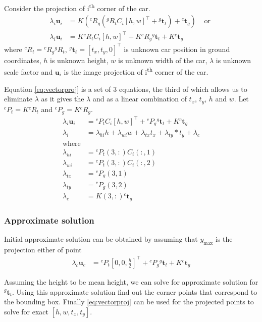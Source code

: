 \documentclass[10pt,twocolumn,letterpaper]{article}
\newcommand{\xymax}[1]{#1_{\text{max}}}
\newcommand{\ymax}{\xymax{y}}
\newcommand{\Tr}[3]{{}^{#1}{#2}_{#3}}
\begin{document}
\newcommand{\ttg}{\Tr{g}{\mathbf{t}}{t}}
\newcommand{\tgc}{\Tr{c}{\mathbf{t}}{g}}
\newcommand{\Rgc}{\Tr{c}{R}{g}}
\newcommand{\Rtg}{\Tr{g}{R}{t}}
\newcommand{\Rtc}{\Tr{c}{R}{t}}
\newcommand{\Pgc}{\Tr{c}{P}{g}}
\newcommand{\Ptc}{\Tr{c}{P}{t}}

Consider the projection of i\textsuperscript{th} corner of the car.
\begin{align}
  \lambda_i \mathbf{u}_i &= K(\Rgc(\Rtg C_i[h, w]^\top + \ttg) + \tgc) & \text{ or }\\
  \lambda_i \mathbf{u}_i &= K\Rtc C_i [h, w]^\top + K\Rgc \ttg + K \tgc
  \label{eq:vectorproj}
\end{align}
where $\Rtc = \Rgc\Rtg$, $\ttg = [t_x, t_y, 0]^\top$ is unknown car position in
ground coordinates, $h$ is unknown height, $w$ is unknown width of the car,
$\lambda$ is unknown scale factor and $\mathbf{u}_i$ is the image projection of
i\textsuperscript{th} corner of the car.

Equation \eqref{eq:vectorproj} is a set of 3 equations, the third of which allows us to eliminate $\lambda$ as it gives the $\lambda$ and as a linear combination of $t_x$, $t_y$, $h$ and $w$. Let $\Ptc = K\Rtc$ and $\Pgc = K\Rgc$.
\begin{align}
  \lambda_i \mathbf{u}_i &=  \Ptc C_i [h, w]^\top + \Pgc \ttg + K \tgc\\
  \lambda_i &= \lambda_{hi}  h + \lambda_{wi}  w + \lambda_{tx}  t_x + \lambda_{ty} * t_y + \lambda_c\\
  \text{where} & \\
  \lambda_{hi} &= \Ptc(3, :) C_i(:, 1)\\
  \lambda_{wi} &= \Ptc(3, :) C_i(:, 2)\\
  \lambda_{tx} &= \Pgc(3, 1)\\
  \lambda_{ty} &= \Pgc(3, 2)\\
   \lambda_{c} &= K(3, :) \tgc
\end{align}

\subsubsection{Approximate solution}
Initial approximate solution can be obtained by assuming that $\ymax$ is the projection either of point 
\begin{align}
  \lambda_c \mathbf{u}_c &= \Ptc[0, 0, \frac{h}{2}]^\top + \Pgc \ttg + K\tgc
\end{align}

Assuming the height to be mean height, we can solve for approximate solution
for $\ttg$. Using this approximate solution find out the corner points that
correspond to the bounding box. Finally \eqref{eq:vectorproj} can be used for
the projected points to solve for exact $[h, w, t_x, t_y]$.
\end{document}

